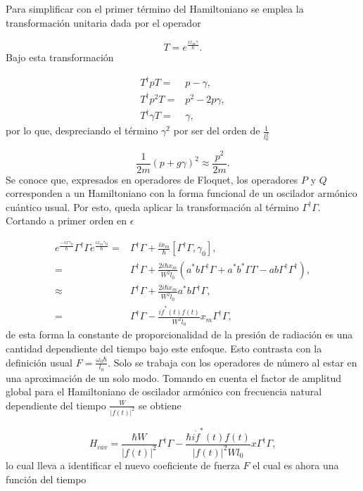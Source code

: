 \documentclass[10pt,a4paper]{report}
\begin{document}
Para simplificar con el primer término del Hamiltoniano se emplea la transformación unitaria dada por el operador

\begin{equation}
T = e^\frac{i x_m \gamma}{\hbar}.
\end{equation} Bajo esta transformación 

\begin{align*}
T^\dagger p T =& p - \gamma, \\
T^\dagger p^2 T =& p^2 -2p\gamma, \\
T^\dagger \gamma T =& \gamma,
\end{align*} por lo que, despreciando el término $\gamma^2$ por ser del orden de $\frac{1}{l_0^2}$

\begin{equation}
\frac{1}{2m}(p + g \gamma)^2 \approx \frac{p^2}{2m}.
\end{equation} Se conoce que, expresados en operadores de Floquet, los operadores $P$ y $Q$ corresponden a un Hamiltoniano con la forma funcional de un oscilador armónico cuántico usual. Por esto, queda aplicar la transformación al término $\Gamma^\dagger \Gamma$. Cortando a primer orden en $\epsilon$

\begin{align*}
e^{\frac{-ix\gamma_0}{\hbar}}\Gamma^\dagger \Gamma e^{\frac{ix_m\gamma_0}{\hbar}} =& \Gamma^\dagger \Gamma + \frac{ix_m}{\hbar}[\Gamma^\dagger \Gamma, \gamma_0], \\
=& \Gamma^\dagger \Gamma + \frac{2i\hbar x_m}{W^2 l_0}(a^*b \Gamma^\dagger \Gamma + a^*b^* \Gamma \Gamma -ab\Gamma^\dagger \Gamma^\dagger),\\
\approx & \Gamma^\dagger \Gamma + \frac{2i\hbar x_m}{W^2 l_0} a^*b \Gamma^\dagger \Gamma, \\
=& \Gamma^\dagger \Gamma - \frac{i \dot{f}^*(t)f(t) }{W^2 l_0} x_m  \Gamma^\dagger \Gamma,
\end{align*} de esta forma la constante de proporcionalidad de la presión de radiación es una cantidad dependiente del tiempo bajo este enfoque. Esto contrasta con la definición usual $F= \frac{\omega_0 \hbar}{l_0}$. Solo se trabaja con los operadores de número al estar en una aproximación de un solo modo. Tomando en cuenta el factor de amplitud global para el Hamiltoniano de oscilador armónico con frecuencia natural dependiente del tiempo $\frac{W}{|f(t)|^2}$ se obtiene

\begin{equation}
H_{cav} = \frac{\hbar W}{|f(t)|^2}\Gamma^\dagger \Gamma - \frac{\hbar i\dot{f}^*(t)f(t) }{|f(t)|^2W l_0}x  \Gamma^ \dagger \Gamma,
\end{equation} lo cual lleva a identificar el nuevo coeficiente de fuerza $F$ el cual es ahora una función del tiempo
\end{document}

